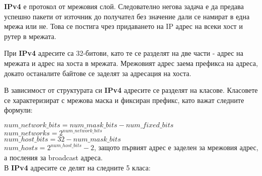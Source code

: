 \documentclass[fleqn,12pt]{article}
\begin{document}
\textbf{IPv4} е протокол от мрежовия слой. Следователно негова задача е да предава успешно пакети от източник до получател без значение дали се намират в една мрежа или не.
Това се постига чрез придаването на IP адрес на всеки хост и рутер в мрежата.

При \textbf{IPv4} адресите са 32-битови, като те се разделят на две части - адрес на мрежата и адрес на хоста в мрежата.
Мрежовият адрес заема префикса на адреса, докато останалите байтове се заделят за адресация на хоста.

В зависимост от структурата си \textbf{IPv4} адресите се разделят на класове. Класовете се характеризират с мрежова маска и фиксиран префикс, като важат следните формули:

$num\_network\_bits = num\_mask\_bits - num\_fixed\_bits$ \\
$num\_networks = 2^{num\_network\_bits}$ \\
$num\_host\_bits = 32 - num\_mask\_bits$ \\
$num\_hosts = 2^{num\_host\_bits} - 2$, защото първият адрес е заделен за мрежовия адрес, а посления за broadcast адреса. \\

В \textbf{IPv4} адресите се делят на следните 5 класа:
\end{document}

